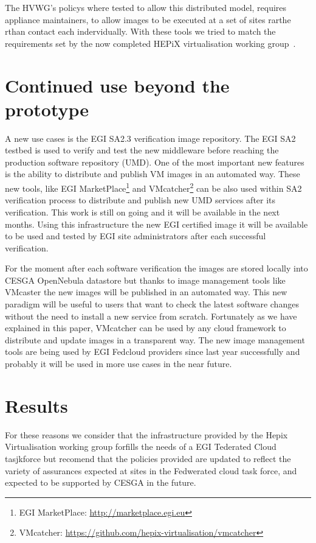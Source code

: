 \documentclass{llncs_Ibergrid2013}
\begin{document}
The HVWG's policys where tested to allow this distributed model, requires appliance maintainers, to allow images to be executed at a set of sites rarthe rthan contact each indervidually. With these tools we tried to match the requirements set by the now completed HEPiX virtualisation working group~\cite{hepix}.

\section{Continued use beyond the prototype}
\label{sect-experiances}


A new use cases is the EGI SA2.3 verification image repository. The EGI SA2 testbed is used to verify and test the new middleware before reaching the production software repository (UMD).
One of the most important new features is the ability to distribute and publish VM images in an automated way. 
These new tools, like EGI MarketPlace\footnote{EGI MarketPlace: \url{http://marketplace.egi.eu}} and VMcatcher\footnote{VMcatcher: \url{https://github.com/hepix-virtualisation/vmcatcher}} can be also used within SA2 verification process to distribute and publish new UMD services after its verification. 
This work is still on going and it will be available in the next months. Using this infrastructure the new EGI certified image it will be available to be used and tested by EGI site administrators after each successful verification.

For the moment after each software verification the images are stored locally into CESGA OpenNebula datastore but thanks to image management tools like VMcaster the new images will be published in an automated way.
This new paradigm will be useful to users that want to check the latest software changes without the need to install a new service from scratch.
Fortunately as we have explained in this paper, VMcatcher can be used by any cloud framework to distribute and update images in a transparent way. 
The new image management tools are being used by EGI Fedcloud providers since last year successfully and probably it will be used in more use cases in the near future.


\section{Results}
\label{sect-results}

For these reasons we consider that the infrastructure provided by the Hepix Virtualisation working group forfills the needs of a EGI Tederated Cloud tasjkforce but recomend that the policies provided are updated to reflect the variety of assurances expected at sites in the Fedwerated cloud task force, and expected to be supported by CESGA in the future.
\end{document}
